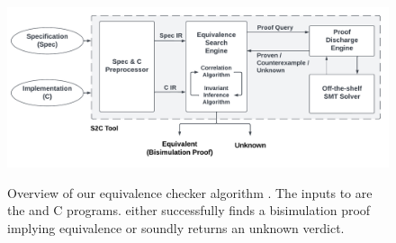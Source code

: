 \begin{figure}
\begin{center}
{\includegraphics[scale=0.495]{chapters/figures/figDiagram.pdf}}
\end{center}
\caption{\label{fig:diagram}Overview of our equivalence checker algorithm \toolName{}.
The inputs to \toolName{} are the \SpecL{} and C programs.
\toolName{} either successfully finds a bisimulation proof implying equivalence or
soundly returns an unknown verdict.}
\end{figure}
